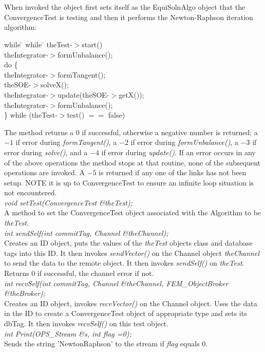   \\
 \\
When invoked the object first sets itself as the EquiSolnAlgo object
that the ConvergenceTest is testing and then it performs the
Newton-Raphson iteration algorithm: 
\begin{tabbing}
while \= \+ while \= \kill
theTest-$>$start() \\
theIntegrator-$>$formUnbalance(); \\
do \{ \+ \\
theIntegrator-$>$formTangent(); \\
theSOE-$>$solveX(); \\
theIntegrator-$>$update(theSOE-$>$getX()); \\
theIntegrator-$>$formUnbalance(); \- \\
\} while (theTest-$>$test() $==$ false)\- 
\end{tabbing}

\noindent The method returns a 0 if successful, otherwise a negative number is
returned; a $-1$ if error during {\em formTangent()}, a $-2$ if
error during {\em formUnbalance()}, a $-3$ if error during {\em
solve()}, and a $-4$ if error during {\em update()}.
If an error occurs in any of the above operations the method stops at
that routine, none of the subsequent operations are invoked. A $-5$ is
returned if any one of the links has not been setup. NOTE it is up to
ConvergenceTest to ensure an infinite loop situation is not encountered. \\

{\em void setTest(ConvergenceTest \&theTest);} \\
A method to set the ConvergenceTest object associated with the
Algorithm to be {\em theTest}. \\

{\em int sendSelf(int commitTag, Channel \&theChannel);}\\
Creates an ID object, puts the values of the {\em theTest} objects
class and database tags into this ID. It then invokes {\em
sendVector()} on the Channel object {\em theChannel} to send the data
to the remote object. It then invokes {\em sendSelf()} on {\em
theTest}. Returns $0$ if successful, the channel error if not. \\

{\em int recvSelf(int commitTag, Channel \&theChannel, FEM\_ObjectBroker
\&theBroker);}\\ 
Creates an ID object, invokes {\em recvVector()} on the Channel
object. Uses the data in the ID to create a ConvergenceTest object of
appropriate type and sets its dbTag. It then invokes {\em recvSelf()}
on this test object. \\

{\em int Print(OPS_Stream \&s, int flag =0);} \\
Sends the string 'NewtonRaphson' to the stream if {\em flag} equals $0$.